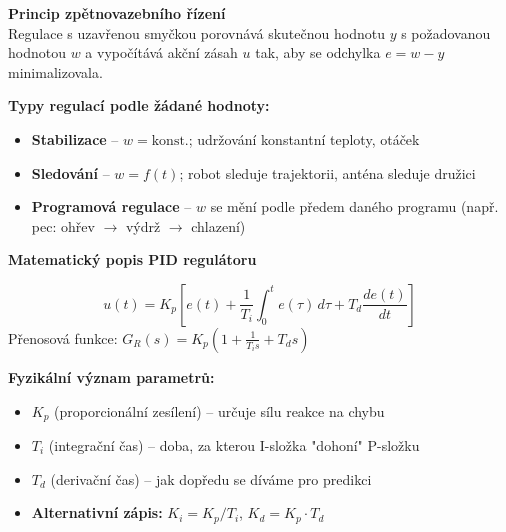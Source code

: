 \documentclass[a4paper,10pt]{article}
\begin{document}
\begin{vysvetlenibox}
\textbf{Princip zpětnovazebního řízení}\\
Regulace s uzavřenou smyčkou porovnává skutečnou hodnotu $y$ s požadovanou
hodnotou $w$ a vypočítává akční zásah $u$ tak, aby se odchylka $e = w - y$
minimalizovala.

\begin{center}
\end{center}

\textbf{Typy regulací podle žádané hodnoty:}
\begin{itemize}[noitemsep, leftmargin=1.4em, topsep=4pt]
    \item \textbf{Stabilizace} -- $w = \text{konst.}$; udržování konstantní teploty, otáček
    \item \textbf{Sledování} -- $w = f(t)$; robot sleduje trajektorii, anténa sleduje družici
    \item \textbf{Programová regulace} -- $w$ se mění podle předem daného programu
          (např. pec: ohřev $\to$ výdrž $\to$ chlazení)
\end{itemize}

\textbf{Matematický popis PID regulátoru}

\begin{vzorcebox}
$$u(t) = K_p \left[ e(t) + \frac{1}{T_i}\int_0^t e(\tau)\,d\tau
+ T_d \frac{de(t)}{dt} \right]$$
Přenosová funkce: $G_R(s) = K_p \left(1 + \frac{1}{T_i s} + T_d s\right)$
\end{vzorcebox}

\textbf{Fyzikální význam parametrů:}
\begin{itemize}[noitemsep, leftmargin=1.4em, topsep=4pt]
    \item \textbf{$K_p$} (proporcionální zesílení) -- určuje sílu reakce na chybu
    \item \textbf{$T_i$} (integrační čas) -- doba, za kterou I-složka "dohoní" P-složku
    \item \textbf{$T_d$} (derivační čas) -- jak dopředu se díváme pro predikci
    \item \textbf{Alternativní zápis:} $K_i = K_p/T_i$, $K_d = K_p \cdot T_d$
\end{itemize}


\end{vysvetlenibox}
\end{document}
